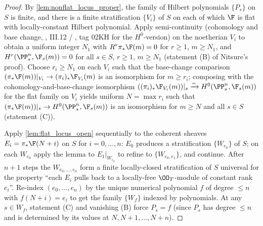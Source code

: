 \begin{proof}
  By \cref{lem:nonflat_locus_proper}, the family of Hilbert polynomials
  \(\{P_s\}\) on \(S\) is finite, and there is a finite stratification
  \(\{V_i\}\) of \(S\) on each of which \(\F\) is flat with locally-constant
  Hilbert polynomial.  Apply semi-continuity (cohomology and base change,
  \cite{hartshorne-ag}, III.12 / \cite{stacks-project}, tag 02KH for the \(H^0\)-version) on
  the noetherian \(V_i\) to obtain a uniform integer \(N_1\) with
  \(R^r \pi_* \F(m) = 0\) for \(r \ge 1\), \(m \ge N_1\), and \(H^r(\PP^n_s, \F_s(m)) = 0\)
  for all \(s \in S\), \(r \ge 1\), \(m \ge N_1\) (statement (B) of Nitsure's proof).
  Choose \(r_i \ge N_1\) on each \(V_i\) such that the base-change comparison
  \((\pi_* \F(m))|_{V_i} \to (\pi_i)_* \F_{V_i}(m)\) is an isomorphism for
  \(m \ge r_i\); composing with the cohomology-and-base-change isomorphism
  \(((\pi_i)_* \F_{V_i}(m))|_s \xrightarrow{\sim} H^0(\PP^n_s, \F_s(m))\) for
  the flat family on \(V_i\) yields uniform \(N = \max r_i\) such that
  \((\pi_* \F(m))|_s \to H^0(\PP^n_s, \F_s(m))\) is an isomorphism for \(m \ge N\)
  and all \(s \in S\) (statement (C)).

  Apply \cref{lem:flat_locus_open} sequentially to the coherent sheaves
  \(E_i = \pi_* \F(N+i)\) on \(S\) for \(i = 0, \dots, n\): \(E_0\) produces a
  stratification \(\{W_{e_0}\}\) of \(S\); on each \(W_{e_0}\) apply the lemma to
  \(E_1|_{W_{e_0}}\) to refine to \(\{W_{e_0, e_1}\}\), and continue. After \(n+1\)
  steps the \(W_{e_0, \dots, e_n}\) form a finite locally-closed stratification
  of \(S\) universal for the property ``each \(E_i\) pulls back to a locally-free
  \(\OO_T\)-module of constant rank \(e_i\)''.  Re-index \((e_0, \dots, e_n)\) by the
  unique numerical polynomial \(f\) of degree \(\le n\) with \(f(N+i) = e_i\) to get
  the family \(\{W_f\}\) indexed by polynomials.  At any \(s \in W_f\), statement
  (C) and vanishing (B) force \(P_s = f\) (since \(P_s\) has degree \(\le n\) and is
  determined by its values at \(N, N+1, \dots, N+n\)).


\end{proof}
